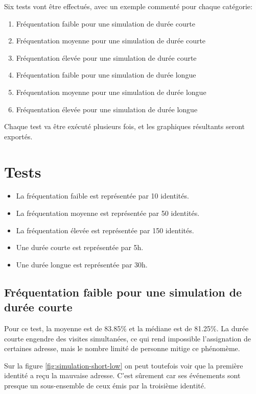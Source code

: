 Six tests vont être effectués, avec un exemple commenté pour chaque catégorie: 
\begin{enumerate}
    \item Fréquentation faible pour une simulation de durée courte
    \item Fréquentation moyenne pour une simulation de durée courte
    \item Fréquentation élevée pour une simulation de durée courte
    \item Fréquentation faible pour une simulation de durée longue
    \item Fréquentation moyenne pour une simulation de durée longue
    \item Fréquentation élevée pour une simulation de durée longue
\end{enumerate}

Chaque test va être exécuté plusieurs fois, et les graphiques résultants seront exportés. 
\section{Tests}
\begin{itemize}
    \item La fréquentation faible est représentée par 10 identités.
    \item La fréquentation moyenne est représentée par 50 identités.
    \item La fréquentation élevée est représentée par 150 identités.
\end{itemize}
\begin{itemize}
    \item Une durée courte est représentée par 5h.
    \item Une durée longue est représentée par 30h.
\end{itemize}


\subsection{Fréquentation faible pour une simulation de durée courte}
Pour ce test, la moyenne est de 83.85\% et la médiane est de 81.25\%.
La durée courte engendre des visites simultanées, ce qui rend impossible l'assignation de certaines adresse, mais
le nombre limité de personne mitige ce phénomème. 

Sur la figure \ref{fig:simulation-short-low} on peut toutefois voir que la première identité a reçu la mauvaise adresse.
C'est sûrement car ses événements sont presque un sous-ensemble de ceux émis par la troisième identité.

